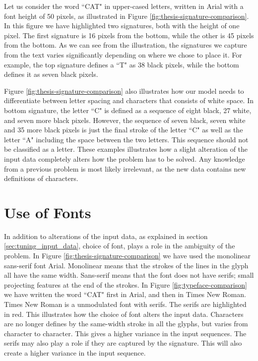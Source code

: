 Let us consider the word ``CAT" in upper-cased letters, written in Arial with a font height of 50 pixels, as illustrated in Figure \ref{fig:thesis-signature-comparison}. In this figure we have highlighted two signatures, both with the height of one pixel. The first signature is 16 pixels from the bottom, while the other is 45 pixels from the bottom. As we can see from the illustration, the signatures we capture from the text varies significantly depending on where we chose to place it. For example, the top signature defines a ``T" as 38 black pixels, while the bottom defines it as seven black pixels.

Figure \ref{fig:thesis-signature-comparison} also illustrates how our model needs to differentiate between letter spacing and characters that consists of white space. In bottom signature, the letter ``C" is defined as a sequence of eight black, 27 white, and seven more black pixels. However, the sequence of seven black, seven white and 35 more black pixels is just the final stroke of the letter ``C" as well as the letter ``A" including the space between the two letters. This sequence should not be classified as a letter. These examples illustrates how a slight alteration of the input data completely alters how the problem has to be solved. Any knowledge from a previous problem is most likely irrelevant, as the new data contains new definitions of characters.


\section{Use of Fonts}
\label{sec:use_of_fonts}
In addition to alterations of the input data, as explained in section \ref{sec:tuning_input_data}, choice of font, plays a role in the ambiguity of the problem. In Figure \ref{fig:thesis-signature-comparison} we have used the monolinear sans-serif font Arial. Monolinear means that the strokes of the lines in the glyph all have the same width. Sans-serif means that the font does not have serifs; small projecting features at the end of the strokes. In Figure \ref{fig:typeface-comparison} we have written the word ``CAT" first in Arial, and then in Times New Roman. Times New Roman is a unmodulated font with serifs. The serifs are highlighted in red. This illustrates how the choice of font alters the input data. Characters are no longer defines by the same-width stroke in all the glyphs, but varies from character to character. This gives a higher variance in the input sequences. The serifs may also play a role if they are captured by the signature. This will also create a higher variance in the input sequence.

